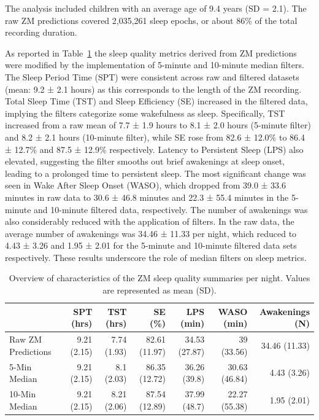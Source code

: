 \documentclass[
  super,
  preprint,
  3p]{elsarticle}
\begin{document}
The analysis included children with an average age of 9.4 years (SD =
2.1). The raw ZM predictions covered 2,035,261 sleep epochs, or about
86\% of the total recording duration.

As reported in Table~\ref{tbl-zm_overview} the sleep quality metrics
derived from ZM predictions were modified by the implementation of
5-minute and 10-minute median filters. The Sleep Period Time (SPT) were
consistent across raw and filtered datasets (mean: 9.2 ± 2.1 hours) as
this corresponds to the length of the ZM recording. Total Sleep Time
(TST) and Sleep Efficiency (SE) increased in the filtered data, implying
the filters categorize some wakefulness as sleep. Specifically, TST
increased from a raw mean of 7.7 ± 1.9 hours to 8.1 ± 2.0 hours
(5-minute filter) and 8.2 ± 2.1 hours (10-minute filter), while SE rose
from 82.6 ± 12.0\% to 86.4 ± 12.7\% and 87.5 ± 12.9\% respectively.
Latency to Persistent Sleep (LPS) also elevated, suggesting the filter
smooths out brief awakenings at sleep onset, leading to a prolonged time
to persistent sleep. The most significant change was seen in Wake After
Sleep Onset (WASO), which dropped from 39.0 ± 33.6 minutes in raw data
to 30.6 ± 46.8 minutes and 22.3 ± 55.4 minutes in the 5-minute and
10-minute filtered data, respectively. The number of awakenings was also
considerably reduced with the application of filters. In the raw data,
the average number of awakenings was 34.46 ± 11.33 per night, which
reduced to 4.43 ± 3.26 and 1.95 ± 2.01 for the 5-minute and 10-minute
filtered data sets respectively. These results underscore the role of
median filters on sleep metrics.

\hypertarget{tbl-zm_overview}{}
\begin{longtable}{lrrrrrr}
\caption{\label{tbl-zm_overview}Overview of characteristics of the ZM sleep quality summaries per night.
Values are represented as mean (SD). }\tabularnewline

\toprule
 & SPT (hrs) & TST (hrs) & SE (\%) & LPS (min) & WASO (min) & Awakenings (N) \\ 
\midrule
Raw ZM Predictions & 9.21 (2.15) & 7.74 (1.93) & 82.61 (11.97) & 34.53 (27.87) & 39 (33.56) & 34.46 (11.33) \\ 
5-Min Median & 9.21 (2.15) & 8.1 (2.03) & 86.35 (12.72) & 36.26 (39.8) & 30.63 (46.84) & 4.43 (3.26) \\ 
10-Min Median & 9.21 (2.15) & 8.21 (2.06) & 87.54 (12.89) & 37.99 (48.7) & 22.27 (55.38) & 1.95 (2.01) \\ 
\bottomrule
\end{longtable}
\end{document}
